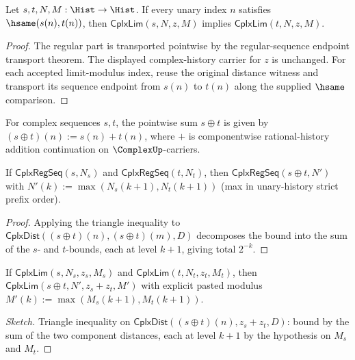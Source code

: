 \begin{theorem}
\label{thm:complex-limit-sequence-hsame-transport}
Let $s,t,N,M:\Hist\to\Hist$. If every unary index $n$ satisfies
$\hsame(s(n),t(n))$, then $\mathsf{CplxLim}(s,N,z,M)$ implies
$\mathsf{CplxLim}(t,N,z,M)$.
\end{theorem}
\begin{proof}
The regular part is transported pointwise by the regular-sequence endpoint
transport theorem. The displayed complex-history carrier for $z$ is unchanged.
For each accepted limit-modulus index, reuse the original distance witness and
transport its sequence endpoint from $s(n)$ to $t(n)$ along the supplied
$\hsame$ comparison.
\end{proof}

\begin{definition}
\label{def:cplx-pointwise-sum}
For complex sequences \(s, t\), the pointwise sum \(s \oplus t\) is given by \((s \oplus t)(n) := s(n) + t(n)\), where \(+\) is componentwise rational-history addition continuation on \(\ComplexUp\)-carriers.
\end{definition}

\begin{lemma}
\label{lem:cplx-sum-regular}
If \(\mathsf{CplxRegSeq}(s, N_s)\) and \(\mathsf{CplxRegSeq}(t, N_t)\), then \(\mathsf{CplxRegSeq}(s \oplus t, N')\) with \(N'(k) := \max(N_s(k+1), N_t(k+1))\) (max in unary-history strict prefix order).
\end{lemma}
\begin{proof}
Applying the triangle inequality to \(\mathsf{CplxDist}((s \oplus t)(n), (s \oplus t)(m), D)\) decomposes the bound into the sum of the \(s\)- and \(t\)-bounds, each at level \(k+1\), giving total \(2^{-k}\).
\end{proof}

\begin{theorem}
\label{thm:cplx-lim-sum}
If \(\mathsf{CplxLim}(s, N_s, z_s, M_s)\) and \(\mathsf{CplxLim}(t, N_t, z_t, M_t)\), then \(\mathsf{CplxLim}(s \oplus t, N', z_s + z_t, M')\) with explicit pasted modulus \(M'(k) := \max(M_s(k+1), M_t(k+1))\).
\end{theorem}
\begin{proof}[Sketch]
Triangle inequality on \(\mathsf{CplxDist}((s \oplus t)(n), z_s + z_t, D)\): bound by the sum of the two component distances, each at level \(k+1\) by the hypothesis on \(M_s\) and \(M_t\).
\end{proof}

